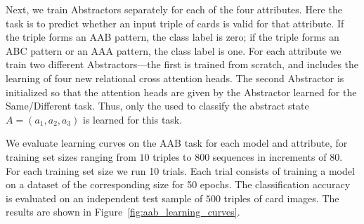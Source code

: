  Next, we train Abstractors separately for each of the four attributes.
Here the task is to predict whether an input triple of cards is valid for that attribute. 
If the triple forms an AAB pattern, the class label is zero; if the triple forms an ABC 
pattern or an AAA pattern, the class label is one. For each attribute we train 
two different Abstractors---the first is trained from scratch, and includes the learning 
of four new relational cross attention heads. The second Abstractor is 
initialized so that the attention heads are given by the Abstractor learned for the 
Same/Different task.
Thus, only the \MLP{} used to classify the abstract state $A=(a_1, a_2, a_3)$ is learned for this task.

 We evaluate learning curves on the AAB task for each 
model and attribute, for training set sizes ranging from $10$ triples to $800$ sequences in increments of $80$. For each training set size we run 10 trials. Each trial consists of training a model on a dataset of the corresponding size for 50 epochs. The classification accuracy is evaluated on an independent test sample of $500$ triples of card images. The results are shown in Figure~\ref{fig:aab_learning_curves}.

